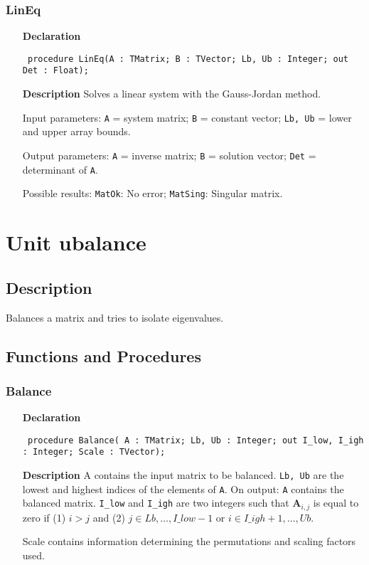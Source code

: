 \documentclass[12pt,a4paper,oneside]{report}
\newcommand{\declarationitem}[1]{\textbf{#1}}
\newcommand{\descriptiontitle}[1]{\textbf{#1}}
\newcommand{\code}[1]{\texttt{#1}}
\begin{document}
\subsubsection{LinEq}
\label{ulineq-LinEq}
\begin{itemize}\item[\declarationitem{Declaration}\hfill]
	\begin{flushleft}
		\code{
			procedure LinEq(A : TMatrix; B : TVector; Lb, Ub : Integer; out Det : Float);}
		
	\end{flushleft}
	
	\par
	\item[\descriptiontitle{Description}]
	Solves a linear system with the Gauss{-}Jordan method.
	
	Input parameters: \code{A} = system matrix; \code{B} = constant vector; \code{Lb, Ub} = lower and upper array bounds.
	
	Output parameters: \code{A} = inverse matrix; \code{B} = solution vector; \code{Det} = determinant of \code{A}.
	
	Possible results: \code{MatOk}: No error; \code{MatSing}: Singular matrix.
	
\end{itemize}
\section{Unit ubalance}
\label{ubalance}
\subsection{Description}
Balances a matrix and tries to isolate eigenvalues. 
\subsection{Functions and Procedures}
\subsubsection{Balance}
\label{ubalance-Balance}
\begin{itemize}\item[\declarationitem{Declaration}\hfill]
	\begin{flushleft}
		\code{
			procedure Balance( A : TMatrix; Lb, Ub : Integer; out I{\_}low, I{\_}igh : Integer; Scale : TVector);}
	\end{flushleft}
	\par
	\item[\descriptiontitle{Description}]
	A contains the input matrix to be balanced. \code{Lb, Ub} are the lowest and highest indices of the elements of \code{A}. On output: \code{A} contains the balanced matrix. \code{I{\_}low} and \code{I{\_}igh} are two integers such that $\textbf{A}_{i,j}$ is equal to zero if (1) $i > j$ and (2) $j \in Lb,\dots,I\!\_low{-}1$ or $i \in I\!\_igh+1,\dots,Ub$.
	
	Scale contains information determining the  permutations and scaling factors used.
	
\end{itemize}
\end{document}

